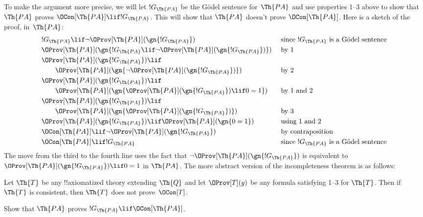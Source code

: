 \documentclass[../../../include/open-logic-section]{subfiles}
\begin{document}
To make the argument more precise, we will let $!G_\Th{PA}$ be the
G\"odel sentence for~$\Th{PA}$ and use properties 1--3 above to show
that $\Th{PA}$ proves $\OCon[\Th{PA}] \lif !G_\Th{PA}$. This will show that
$\Th{PA}$ doesn't prove $\OCon[\Th{PA}]$. Here is a sketch of the proof,
in~$\Th{PA}$:
\begin{align*}
& !G_\Th{PA} \lif \lnot \OProv[\Th{PA}](\gn{!G_\Th{PA}}) &\ & 
  \text{since $!G_\Th{PA}$ is a G\"odel  sentence} \\
& \OProv[\Th{PA}](\gn{!G_\Th{PA} \lif \lnot \OProv[\Th{PA}](\gn{!G_\Th{PA}})}) && 
   \text{by 1} \\
& \OProv[\Th{PA}](\gn{!G_\Th{PA}}) \lif \\
& \qquad \OProv[\Th{PA}](\gn{\lnot \OProv[\Th{PA}](\gn{!G_\Th{PA}})}) &&
   \text{by 2} \\
& \OProv[\Th{PA}](\gn{!G_\Th{PA}}) \lif \\
& \qquad \OProv[\Th{PA}](\gn{\OProv[\Th{PA}](\gn{!G_\Th{PA}}) \lif 0 = 1}) &&
   \text{by 1 and 2} \\
& \OProv[\Th{PA}](\gn{!G_\Th{PA}}) \lif \\
& \qquad \OProv[\Th{PA}](\gn{\OProv[\Th{PA}](\gn{!G_\Th{PA}})}) &&
   \text{by 3} \\
& \OProv[\Th{PA}](\gn{!G_\Th{PA}}) \lif \OProv[\Th{PA}](\gn{0=1}) &&
   \text{using 1 and 2} \\
& \OCon[\Th{PA}] \lif \lnot \OProv[\Th{PA}](\gn{!G_\Th{PA}}) &&
   \text{by contraposition} \\
& \OCon[\Th{PA}] \lif !G_\Th{PA} &&
   \text{since $!G_\Th{PA}$ is a G\"odel sentence}
\end{align*}
The move from the third to the fourth line uses the fact that $\lnot
\OProv[\Th{PA}](\gn{!G_\Th{PA}})$ is equivalent to
$\OProv[\Th{PA}](\gn{!G_\Th{PA}}) \lif 0 = 1$ in $\Th{PA}$. The more
abstract version of the incompleteness theorem is as follows:

\begin{thm}
Let $\Th{T}$ be any !!{axiomatized} theory extending $\Th{Q}$ and let
$\OProv[T](y)$ be any formula satisfying 1--3 for $\Th{T}$. Then if
$\Th{T}$ is consistent, then $\Th{T}$ does not prove~$\OCon[T]$.
\end{thm}

\begin{prob}
Show that $\Th{PA}$ proves $!G_{\Th{PA}} \lif \OCon[\Th{PA}]$.
\end{prob}
\end{document}
